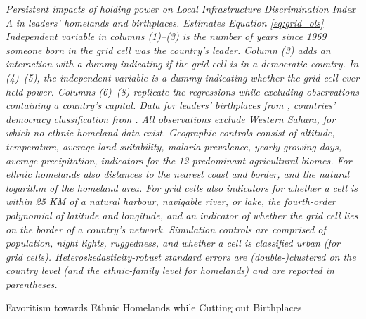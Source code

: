 \documentclass[11pt, oneside]{article}   	%
\newcommand{\mysubcaption}[1]{
\justify
\begin{spacing}{0.7}
\textit{\footnotesize #1}
\end{spacing}}
\begin{document}
\begin{spacing}{1.3}
\begin{table}[!t]
    \mysubcaption{Persistent impacts of holding power on Local Infrastructure Discrimination Index $\Lambda$ in leaders' homelands and birthplaces. Estimates Equation \eqref{eq:grid_ols} Independent variable in columns (1)--(3) is the number of years since 1969 someone born in the grid cell was the country's leader. Column (3) adds an interaction with a dummy indicating if the grid cell is in a democratic country. In (4)--(5), the independent variable is a dummy indicating whether the grid cell ever held power. Columns (6)--(8) replicate the regressions while excluding observations containing a country's capital. Data for leaders' birthplaces from \cite{Dreher_AiddemandAfrican_2016}, countries' democracy classification from \cite{Marshall_PolityProjectCenter_2015}. All observations exclude Western Sahara, for which no ethnic homeland data exist. Geographic controls consist of altitude, temperature, average land suitability, malaria prevalence, yearly growing days, average precipitation, indicators for the 12 predominant agricultural biomes. For ethnic homelands also distances to the nearest coast and border, and the natural logarithm of the homeland area. For grid cells also indicators for whether a cell is within 25 KM of a natural harbour, navigable river, or lake, the fourth-order polynomial of latitude and longitude, and an indicator of whether the grid cell lies on the border of a country's network. Simulation controls are comprised of population, night lights, ruggedness, and whether a cell is classified urban (for grid cells). Heteroskedasticity-robust standard errors are (double-)clustered on the country level (and the ethnic-family level for homelands) and are reported in parentheses.}
    \end{table}

  \begin{table}[h] \centering
    \caption{Favoritism towards Ethnic Homelands while Cutting out Birthplaces}
    \label{tab:APP:favoritism_sans}
    \resizebox{\textwidth}{!}{


}
\end{table}
\end{spacing}
\end{document}
